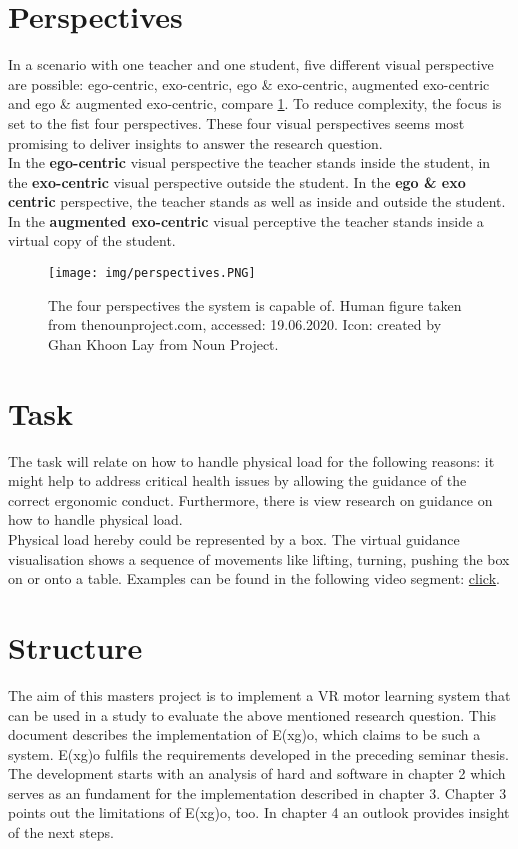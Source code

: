 \section{Perspectives}
In a scenario with one teacher and one student, five different visual perspective are possible: ego-centric, exo-centric, ego \& exo-centric, augmented exo-centric and ego \& augmented exo-centric, compare \ref{fig:perspectives}. To reduce complexity, the focus is set to the fist four perspectives. These four visual perspectives seems most promising to deliver insights to answer the research question.\\
In the \textbf{ego-centric} visual perspective the teacher stands inside the student, in the \textbf{exo-centric} visual perspective outside the student. In the \textbf{ego \& exo centric} perspective, the teacher stands as well as inside and outside the student. In the \textbf{augmented exo-centric} visual perceptive the teacher stands inside a virtual copy of the student.\\
\begin{figure}
	\centering
	\texttt{[image: img/perspectives.PNG]}
	\caption{The four perspectives the system is capable of. Human figure taken from thenounproject.com, accessed: 19.06.2020. Icon: created by Ghan Khoon Lay from Noun Project.}
	\label{fig:perspectives}
\end{figure}

\section{Task}
The task will relate on how to handle physical load for the following reasons: it might help to address critical health issues by allowing the guidance of the correct ergonomic conduct. Furthermore, there is view research on guidance on how to handle physical load.\\
Physical load hereby could be represented by a box. The virtual guidance visualisation shows a sequence of movements like lifting, turning, pushing the box on or onto a table. Examples can be found in the following video segment: \href{https://youtu.be/XR5dDxk40WM?t=228}{click}.

\section{Structure}
The aim of this masters project is to implement a VR motor learning system that can be used in a study to evaluate the above mentioned research question. This document describes the implementation of E(x\textbar g)o, which claims to be such a system. E(x\textbar g)o fulfils the requirements developed in the preceding seminar thesis. The development starts with an analysis of hard and software in chapter 2 which serves as an fundament for the implementation described in chapter 3. Chapter 3 points out the limitations of E(x\textbar g)o, too. In chapter 4 an outlook provides insight of the next steps.
\clearpage
